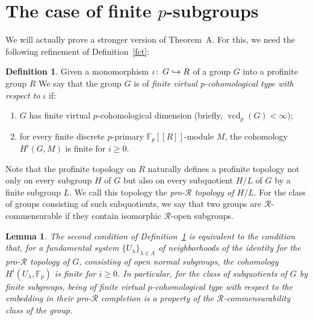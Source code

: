 \documentclass[12pt,twoside]{amsart}
\newcommand\F{{\mathbb F}}
\newcommand\cR{{\mathcal R}}
\newcommand\hookra{\hookrightarrow}
\newcommand\ld{\lambda}
\newcommand\Ld{\Lambda}
\def\co{\colon\thinspace}
\newcommand\vcd{\operatorname{vcd}}
\newtheorem{lemma}[theorem]{Lemma}
\theoremstyle{definition}
\newtheorem{definition}[theorem]{Definition}
\begin{document}
\section{The case of finite $p$-subgroups}
We will actually prove a stronger version of Theorem~A. For this, we need the following refinement of Definition~\ref{fct}:

\begin{definition}\label{fct2}Given a monomorphism $\iota\co G\hookra R$ of a group $G$ into a profinite group $R$
We say that the group $G$ is of \emph{finite virtual $p$-cohomological type with respect to $\iota$} if:
\begin{enumerate}
\item $G$ has finite virtual $p$-cohomological dimension (briefly, $\vcd_p(G)<\infty$);
\item for every finite discrete $p$-primary $\F_p[[R]]$-module $M$, the cohomology $H^i(G,M)$ is finite for $i\geq 0$.
\end{enumerate}
\end{definition}

Note that the profinite topology on $R$ naturally defines a profinite topology not only on every subgroup $H$ of $G$ but also on every subquotient $H/L$
of $G$ by a finite subgroup $L$. We call this topology the \emph{pro-$\cR$ topology of $H/L$}. For the class of groups consisting of such subquotients, 
we say that two groups are $\cR$-commensurable if they contain isomorphic $\cR$-open subgroups.

\begin{lemma}\label{equivfct}The second condition of Definition~\ref{fct2} is equivalent to the condition that, for a fundamental 
system $\{U_\ld\}_{\ld\in\Ld}$ of neighborhoods of the identity for the pro-$\cR$ topology of $G$, consisting of open normal 
subgroups, the cohomology $H^i(U_\ld,\F_p)$ is finite for $i\geq 0$. In particular, for the class of subquotients of $G$ by finite subgroups, 
being of finite virtual $p$-cohomological type with respect to the embedding in their pro-$\cR$ completion is a property of 
the $\cR$-commensurability class of the group.
\end{lemma}
\end{document}
